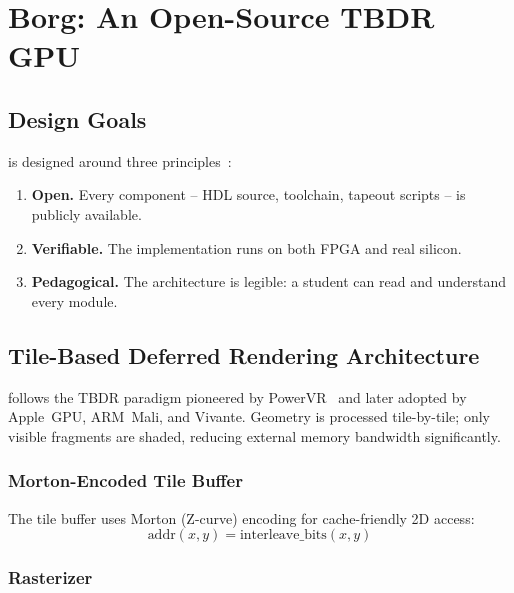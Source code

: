 \chapter{Borg: An Open-Source TBDR GPU}
\label{chap:borg}

\section{Design Goals}

\borg{} is designed around three principles~\cite{Wendleder2024Borg}:
\begin{enumerate}
  \item \textbf{Open.} Every component -- HDL source, toolchain, tapeout scripts -- is publicly available.
  \item \textbf{Verifiable.} The implementation runs on both FPGA and real silicon.
  \item \textbf{Pedagogical.} The architecture is legible: a student can read and understand every module.
\end{enumerate}

\section{Tile-Based Deferred Rendering Architecture}

\borg{} follows the TBDR paradigm pioneered by PowerVR~\cite{Img1996TBDR}
and later adopted by Apple~GPU, ARM~Mali, and Vivante.
Geometry is processed tile-by-tile; only visible fragments are shaded,
reducing external memory bandwidth significantly.

\subsection{Morton-Encoded Tile Buffer}

The tile buffer uses Morton (Z-curve) encoding for cache-friendly 2D access:
\begin{equation}
  \text{addr}(x, y) = \text{interleave\_bits}(x, y)
\end{equation}

\subsection{Rasterizer}


